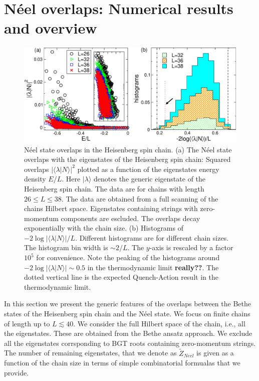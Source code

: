 \documentclass[11pt]{iopart}
\begin{document}
\section{N\'eel overlaps: Numerical results and overview}
\label{sec:5}


\begin{figure}[t]
\begin{center}
\includegraphics[width=.9\textwidth]{./draft_figs/Neel_overlaps}
\end{center}
\caption{ N\'eel state overlaps in the Heisenberg spin chain. (a) 
 The N\'eel state overlaps with the eigenstates of the Heisenberg 
 spin chain: Squared overlaps $|\langle\lambda|N\rangle|^2$ plotted 
 as a function of the eigenstates energy density $E/L$. Here $|\lambda
 \rangle$ denotes the generic eigenstate of the Heisenberg spin chain. 
 The data are for chains with length $26\le L\le 38$. The data are 
 obtained from a full scanning of the chains Hilbert space. 
 Eigenstates containing strings with zero-momentum components 
 are escluded. The overlaps decay exponentially with the chain size. 
 (b) Histograms of $-2\log|\langle\lambda|N\rangle|/L$. Different 
 histograms are for different chain sizes. The histogram bin width 
 is $\sim 2/L$. The $y$-axis is rescaled by a factor $10^5$ for 
 convenience. Note the peaking of the histograms around 
 $-2\log|\langle\lambda|N\rangle|\sim 0.5$ in the thermodynamic 
 limit {\bf really??}. The dotted vertical line is the expected 
 Quench-Action result in the thermodynamic limit.  
}
\label{fig0:neel-ov}
\end{figure}


In this section we present the generic features of the overlaps between the Bethe 
states of the Heisenberg spin chain and the N\'eel state. We focus on finite chains 
of length up to $L\lesssim 40$. We consider the full Hilbert space of the chain, 
i.e., all the eigenstates. These are obtained from the Bethe ansatz approach. 
We exclude all the eigenstates corrsponding to BGT roots containing zero-momentum 
strings. The number of remaining eigenstates, that we denote as $\widetilde Z_{Neel}$ 
is given as a function of the chain size in terms of simple combinatorial formualas 
that we provide. 
\end{document}
